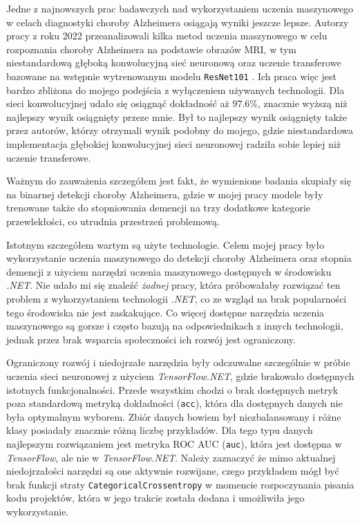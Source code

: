 Jedne z najnowszych prac badawczych nad wykorzystaniem uczenia maszynowego w celach diagnostyki choroby Alzheimera osiągają wyniki jeszcze lepsze.
Autorzy pracy z roku 2022 przeanalizowali kilka metod uczenia maszynowego w celu rozpoznania choroby Alzheimera na podstawie obrazów MRI, w tym niestandardową głęboką konwolucyjną sieć neuronową oraz uczenie transferowe bazowane na wstępnie wytrenowanym modelu \lstinline{ResNet101} \cite{mamun2022deep}.
Ich praca więc jest bardzo zbliżona do mojego podejścia z wyłączeniem używanych technologii.
Dla sieci konwolucyjnej udało się osiągnąć dokładność aż $97.6\%$, znacznie wyższą niż najlepszy wynik osiągnięty przeze mnie.
Był to najlepszy wynik osiągnięty także przez autorów, którzy otrzymali wynik podobny do mojego, gdzie niestandardowa implementacja głębokiej konwolucyjnej sieci neuronowej radziła sobie lepiej niż uczenie transferowe.

Ważnym do zauważenia szczegółem jest fakt, że wymienione badania skupiały się na binarnej detekcji choroby Alzheimera, gdzie w mojej pracy modele były trenowane także do stopniowania demencji na trzy dodatkowe kategorie przewlekłości, co utrudnia przestrzeń problemową.

Istotnym szczegółem wartym są użyte technologie.
Celem mojej pracy było wykorzystanie uczenia maszynowego do detekcji choroby Alzheimera oraz stopnia demencji z użyciem narzędzi uczenia maszynowego dostępnych w środowisku \emph{.NET}.
Nie udało mi się znaleźć \emph{żadnej} pracy, która próbowałaby rozwiązać ten problem z wykorzystaniem technologii \emph{.NET}, co ze wzgląd na brak popularności tego środowiska nie jest zaskakujące.
Co więcej dostępne narzędzia uczenia maszynowego są gorsze i często bazują na odpowiednikach z innych technologii, jednak przez brak wsparcia społeczności ich rozwój jest ograniczony.

Ograniczony rozwój i niedojrzałe narzędzia były odczuwalne szczególnie w próbie uczenia sieci neuronowej z użyciem \emph{TensorFlow.NET}, gdzie brakowało dostępnych istotnych funkcjonalności.
Przede wszystkim chodzi o brak dostępnych metryk poza standardową metryką dokładności (\lstinline{acc}), która dla dostępnych danych nie była optymalnym wyborem.
Zbiór danych bowiem był niezbalansowany i różne klasy posiadały znacznie różną liczbę przykładów.
Dla tego typu danych najlepszym rozwiązaniem jest metryka ROC AUC (\lstinline{auc}), która jest dostępna w \emph{TensorFlow}, ale nie w \emph{TensorFlow.NET}.
Należy zaznaczyć że mimo aktualnej niedojrzałości narzędzi są one aktywnie rozwijane, czego przykładem mógł być brak funkcji straty \lstinline{CategoricalCrossentropy} w momencie rozpoczynania pisania kodu projektów, która w jego trakcie została dodana i umożliwiła jego wykorzystanie.

